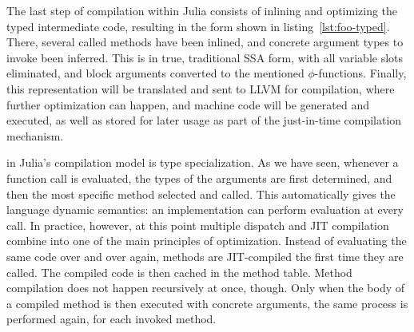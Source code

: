 The last step of compilation within Julia consists of inlining and optimizing the typed intermediate
code, resulting in the form shown in listing~\ref{lst:foo-typed}.  There, several called methods
have been inlined, and concrete argument types to invoke been inferred.  This is in true,
traditional SSA form, with all variable slots eliminated, and block arguments converted to the
mentioned \(\phi\)-functions.  Finally, this representation will be translated and sent to LLVM for
compilation, where further optimization can happen, and machine code will be generated and executed,
as well as stored for later usage as part of the just-in-time compilation mechanism.

 in Julia's compilation model is type
specialization\parencite{bezanson2018julia}.  As we have seen, whenever a function call is
evaluated, the types of the arguments are first determined, and then the most specific method
selected and called.  This automatically gives the language dynamic semantics: an implementation can
perform evaluation at every call.  In practice, however, at this point multiple dispatch and JIT
compilation combine into one of the main principles of optimization.  Instead of evaluating the same
code over and over again, methods are JIT-compiled the first time they are called.  The compiled
code is then cached in the method table.  Method compilation does not happen recursively at once,
though.  Only when the body of a compiled method is then executed with concrete arguments, the same
process is performed again, for each invoked method.

